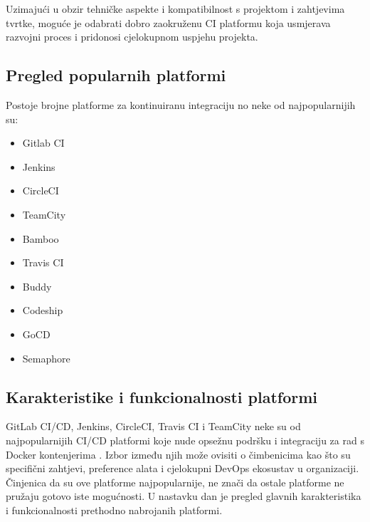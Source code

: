 \documentclass[a4paper,12pt,oneside]{article}
\begin{document}
Uzimajući u obzir tehničke aspekte i kompatibilnost s projektom i zahtjevima tvrtke, moguće je odabrati dobro zaokruženu CI platformu koja usmjerava razvojni proces i pridonosi cjelokupnom uspjehu projekta.

\newpage

\subsection{Pregled popularnih platformi}
Postoje brojne platforme za kontinuiranu integraciju no neke od najpopularnijih su:

\begin{multicols}{2}
\begin{itemize}
\item Gitlab CI
\item Jenkins
\item CircleCI
\item TeamCity
\item Bamboo
\item Travis CI
\item Buddy
\item Codeship
\item GoCD
\item Semaphore
\end{itemize}
\end{multicols}



\subsection{Karakteristike i funkcionalnosti platformi}
GitLab CI/CD, Jenkins, CircleCI, Travis CI i TeamCity neke su od najpopularnijih CI/CD platformi koje nude opsežnu podršku i integraciju za rad s Docker kontenjerima \cite{katalon_ci_tools, atlassian_ci_tools, top_7_ci_tools}. Izbor između njih može ovisiti o čimbenicima kao što su specifični zahtjevi, preference alata i cjelokupni DevOps ekosustav u organizaciji. Činjenica da su ove platforme najpopularnije, ne znači da ostale platforme ne pružaju gotovo iste mogućnosti. U nastavku dan je pregled glavnih karakteristika i funkcionalnosti prethodno nabrojanih platformi.
\end{document}
